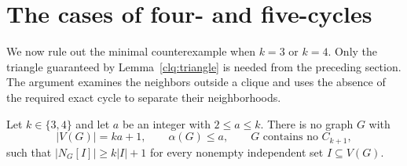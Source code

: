 \section{The cases of four- and five-cycles}
\label{sec:small}

We now rule out the minimal counterexample when $k=3$ or $k=4$.
Only the triangle guaranteed by Lemma~\ref{clq:triangle} is needed
from the preceding section. The argument examines the neighbors
outside a clique and uses the absence of the required exact cycle
to separate their neighborhoods.

\begin{proposition}\label{small:cases}
Let $k\in\{3,4\}$ and let $a$ be an integer with $2\le a\le k$.
There is no graph $G$ with
\[
  |V(G)|=ka+1,\qquad \alpha(G)\le a,
  \qquad G\text{ contains no }C_{k+1},
\]
such that $|N_G[I]|\ge k|I|+1$ for every nonempty independent set
$I\subseteq V(G)$.
\end{proposition}

